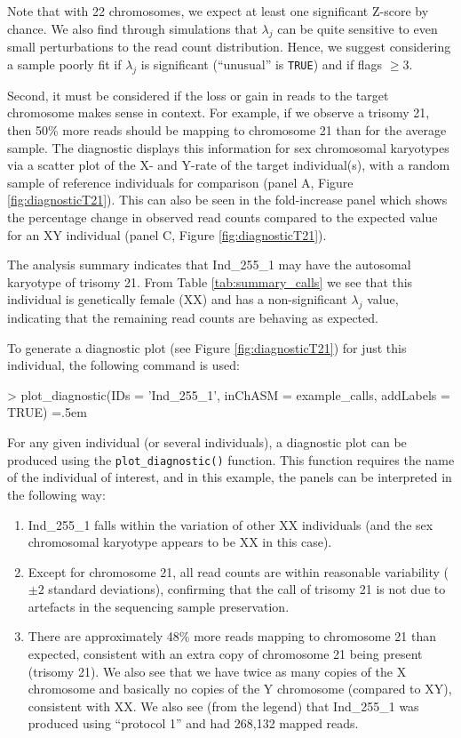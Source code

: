\documentclass[10pt,a4paper]{article}
\newenvironment{cverbatim1}
 {\SaveVerbatim{cverb}}
 {\endSaveVerbatim
    \relsize{-1}\fboxrule=0pt\fboxsep=.5em
  \colorbox{cverbbg}{\BUseVerbatim{cverb}}%
}
\begin{document}
Note that with 22 chromosomes, we expect at least one significant Z-score by chance. We also find through simulations that $\lambda_j$ can be quite sensitive\cite{rohrlach2026chasm} to even small perturbations to the read count distribution. Hence, we suggest considering a sample poorly fit if $\lambda_j$ is significant (``unusual'' is \texttt{TRUE}) and if flags $\geq3$.

Second, it must be considered if the loss or gain in reads to the target chromosome makes sense in context. For example, if we observe a trisomy 21, then 50\% more reads should be mapping to chromosome 21 than for the average sample. The diagnostic displays this information for sex chromosomal karyotypes via a scatter plot of the X- and Y-rate of the target individual(s), with a random sample of reference individuals for comparison (panel A, Figure \ref{fig:diagnosticT21}). This can also be seen in the fold-increase panel which shows the percentage change in observed read counts compared to the expected value for an XY individual (panel C, Figure \ref{fig:diagnosticT21}). 

The analysis summary indicates that Ind\_255\_1 may have the autosomal karyotype of trisomy 21. From Table \ref{tab:summary_calls} we see that this individual is genetically female (XX) and has a non-significant $\lambda_j$ value, indicating that the remaining read counts are behaving as expected. 

To generate a diagnostic plot (see Figure \ref{fig:diagnosticT21}) for just this individual, the following command is used:

\begin{cverbatim1}
> plot_diagnostic(IDs = 'Ind_255_1',
                  inChASM = example_calls, 
                  addLabels = TRUE)
\end{cverbatim1}

For any given individual (or several individuals), a diagnostic plot can be produced using the \texttt{plot\_diagnostic()} function. This function requires the name of the individual of interest, and in this example, the panels can be interpreted in the following way:

\begin{enumerate}[label=\Alph*.]
    \item Ind\_255\_1 falls within the variation of other XX individuals (and the sex chromosomal karyotype appears to be XX in this case).
    \item Except for chromosome 21, all read counts are within reasonable variability ($\pm2$ standard deviations), confirming that the call of trisomy 21 is not due to artefacts in the sequencing sample preservation.
    \item There are approximately 48\% more reads mapping to chromosome 21 than expected, consistent with an extra copy of chromosome 21 being present (trisomy 21). We also see that we have twice as many copies of the X chromosome and basically no copies of the Y chromosome (compared to XY), consistent with XX. We also see (from the legend) that Ind\_255\_1 was produced using “protocol 1” and had 268,132 mapped reads.
\end{enumerate}
\end{document}
